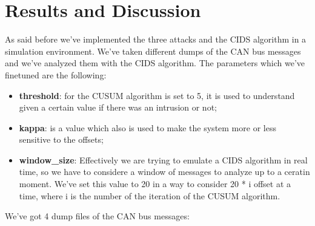 \documentclass[12pt]{article}
\begin{document}
\section{Results and Discussion}
As said before we've implemented the three attacks and the CIDS algorithm in a simulation environment.
We've taken different dumps of the CAN bus messages and we've analyzed them with the CIDS algorithm. 
The parameters which we've finetuned are the following:
\begin{itemize}
    \item \textbf{threshold}: for the CUSUM algorithm is set to 5, it is used to 
    understand given a certain value if there was an intrusion or not;
    \item \textbf{kappa}: is a value which also is used to make the system more or less sensitive to the offsets;
    \item \textbf{window\_size}: Effectively we are trying to emulate a CIDS algorithm in real time, 
    so we have to considere a window of messages to analyze up to a ceratin moment. We've set this value to 
    20 in a way to consider 20 * i offset at a time, where i is the number of the iteration 
    of the CUSUM algorithm.
\end{itemize}
We've got 4 dump files of the CAN bus messages:
\end{document}
